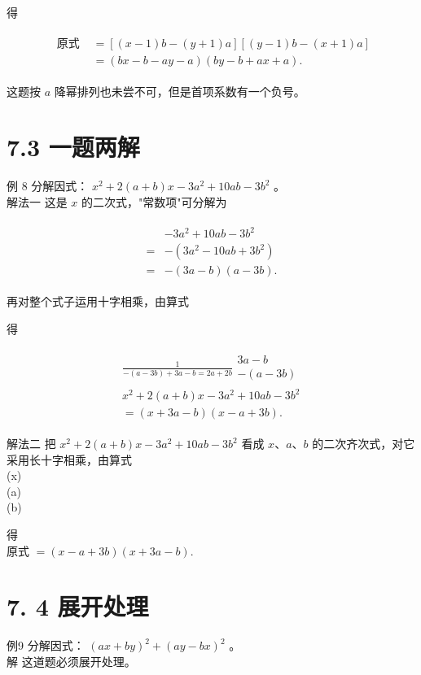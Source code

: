 \documentclass[10pt]{article}
\begin{document}
得

\begin{align*}
\begin{aligned}
\text { 原式 } & =[(x-1) b-(y+1) a][(y-1) b-(x+1) a] \\
& =(b x-b-a y-a)(b y-b+a x+a) .
\end{aligned}
\end{align*}

这题按 $a$ 降幂排列也未尝不可，但是首项系数有一个负号。

\section*{7.3 一题两解}
例 8 分解因式： $x^{2}+2(a+b) x-3 a^{2}+10 a b-3 b^{2}$ 。\\
解法一 这是 $x$ 的二次式，"常数项"可分解为

\begin{align*}
\begin{aligned}
& -3 a^{2}+10 a b-3 b^{2} \\
= & -\left(3 a^{2}-10 a b+3 b^{2}\right) \\
= & -(3 a-b)(a-3 b) .
\end{aligned}
\end{align*}

再对整个式子运用十字相乘，由算式

得

\begin{align*}
\begin{gathered}
\frac{1}{-(a-3 b)+3 a-b=2 a+2 b} \begin{array}{c}
3 a-b \\
-(a-3 b)
\end{array} \\
x^{2}+2(a+b) x-3 a^{2}+10 a b-3 b^{2} \\
=(x+3 a-b)(x-a+3 b) .
\end{gathered}
\end{align*}

解法二 把 $x^{2}+2(a+b) x-3 a^{2}+10 a b-3 b^{2}$ 看成 $x 、 a 、 b$ 的二次齐次式，对它采用长十字相乘，由算式\\
(x)\\
(a)\\
(b)

得\\
原式 $=(x-a+3 b)(x+3 a-b)$.

\section*{7. 4 展开处理}
例9 分解因式： $(a x+b y)^{2}+(a y-b x)^{2}$ 。\\
解 这道题必须展开处理。
\end{document}
